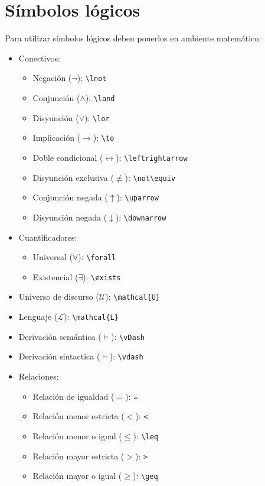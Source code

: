\documentclass[11pt]{article} %
\begin{document}
\section{Símbolos lógicos}
Para utilizar símbolos lógicos deben ponerlos en ambiente matemático.
\begin{itemize}
  
\item Conectivos:
  
  \begin{itemize}
  \item Negación ($\lnot$): \verb!\lnot!
  \item Conjunción ($\land$): \verb!\land!
  \item Disyunción ($\lor$): \verb!\lor!
  \item Implicación ($\to$): \verb!\to!
  \item Doble condicional ($\leftrightarrow$): \verb!\leftrightarrow!
  \item Disyunción exclusiva ($\not\equiv$): \verb!\not\equiv!
  \item Conjunción negada ($\uparrow$): \verb!\uparrow!
  \item Disyunción negada ($\downarrow$): \verb!\downarrow!
  \end{itemize}
  
\item Cuantificadores:
  
  \begin{itemize}
  \item Universal ($\forall$): \verb!\forall!
  \item Existencial ($\exists$): \verb!\exists!
  \end{itemize}
  
\item Universo de discurso ($\mathcal{U}$): \verb!\mathcal{U}!
  
\item Lenguaje ($\mathcal{L}$): \verb!\mathcal{L}!
  
\item Derivación semántica ($\vDash$): \verb!\vDash!
  
\item Derivación sintactica ($\vdash$): \verb!\vdash!

\item Relaciones:
  \begin{itemize}
  \item Relación de igualdad ($=$): \verb!=!
  \item Relación menor estricta ($<$): \verb!<!
  \item Relación menor o igual ($\leq$): \verb!\leq!
  \item Relación mayor estricta ($>$): \verb!>!
  \item Relación mayor o igual ($\geq$): \verb!\geq!
  \end{itemize}
  
\end{itemize}
\end{document}
